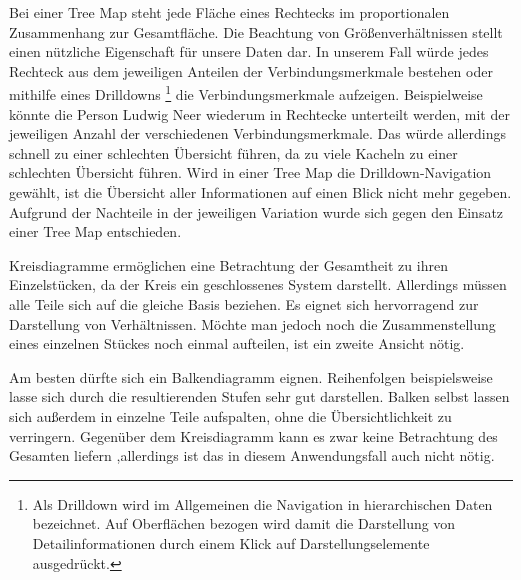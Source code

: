 Bei einer Tree Map steht jede Fläche eines Rechtecks im proportionalen Zusammenhang zur Gesamtfläche. Die Beachtung von Größenverhältnissen stellt einen nützliche Eigenschaft für unsere Daten dar. In unserem Fall würde jedes Rechteck aus dem jeweiligen Anteilen der Verbindungsmerkmale bestehen oder mithilfe eines Drilldowns
\footnote[1]{Als Drilldown wird im Allgemeinen die Navigation in hierarchischen Daten bezeichnet. Auf Oberflächen bezogen wird damit die Darstellung von Detailinformationen durch einem Klick auf Darstellungselemente ausgedrückt. }
 die Verbindungsmerkmale aufzeigen. Beispielweise könnte die Person Ludwig Neer wiederum in Rechtecke unterteilt werden, mit der jeweiligen Anzahl der verschiedenen Verbindungsmerkmale. Das würde allerdings schnell zu einer schlechten Übersicht führen, da zu viele Kacheln zu einer schlechten Übersicht führen. Wird in einer Tree Map die Drilldown-Navigation gewählt, ist die Übersicht aller Informationen auf einen Blick nicht mehr gegeben. Aufgrund der Nachteile in der jeweiligen Variation wurde sich gegen den Einsatz einer Tree Map entschieden.

Kreisdiagramme ermöglichen eine Betrachtung der Gesamtheit zu ihren Einzelstücken, da der Kreis ein geschlossenes System darstellt. Allerdings müssen alle Teile sich auf die gleiche Basis beziehen. Es eignet sich hervorragend zur Darstellung von Verhältnissen. Möchte man jedoch noch die Zusammenstellung eines einzelnen Stückes noch einmal aufteilen, ist ein zweite Ansicht nötig. 

Am besten dürfte sich ein Balkendiagramm eignen. Reihenfolgen beispielsweise lasse sich durch die resultierenden Stufen sehr gut darstellen. Balken selbst lassen sich außerdem in einzelne Teile aufspalten, ohne die Übersichtlichkeit zu verringern. Gegenüber dem Kreisdiagramm kann es zwar keine Betrachtung des Gesamten liefern ,allerdings ist das in diesem Anwendungsfall auch nicht nötig. 